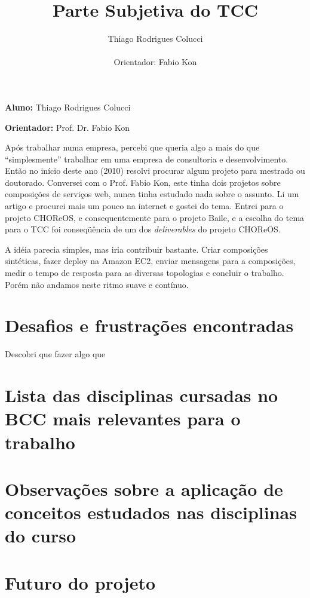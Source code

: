 \documentclass[11pt,a4paper]{article}
\title{Parte Subjetiva do TCC}
\author{Thiago Rodrigues Colucci\\\\Orientador: Fabio Kon}
\begin{document}
\maketitle

\newpage

\tableofcontents
\newpage
\textbf{Aluno:} Thiago Rodrigues Colucci

\textbf{Orientador:} Prof. Dr. Fabio Kon


Após trabalhar numa empresa, percebi que queria algo a mais do que ``simplesmente'' trabalhar em uma empresa de consultoria e desenvolvimento. Então no início deste ano (2010) resolvi procurar algum projeto para mestrado ou doutorado. Conversei com o Prof. Fabio Kon, este tinha dois projetos sobre composições de serviços web, nunca tinha estudado nada sobre o assunto. Li um artigo e procurei mais um pouco na internet e gostei do tema. Entrei para o projeto CHOReOS, e consequentemente para o projeto Baile, e a escolha do tema para o TCC foi conseqüência de um dos \emph{deliverables} do projeto CHOReOS.

A idéia parecia simples, mas iria contribuir bastante. Criar composições sintéticas, fazer deploy na Amazon EC2, enviar mensagens para a composições, medir o tempo de resposta para as diversas topologias e concluir o trabalho. Porém não andamos neste ritmo suave e contínuo.

\section{ Desafios e frustrações encontradas}
Descobri que fazer algo que




\section{Lista das disciplinas cursadas no BCC mais relevantes para o trabalho}







\section{Observações sobre a aplicação de conceitos estudados nas disciplinas do curso}






\section{Futuro do projeto}
\end{document}
